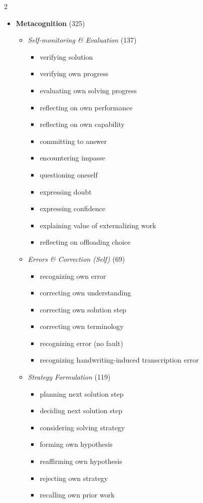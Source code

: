 \begin{multicols}{2}
\begin{itemize}[leftmargin=*, itemsep=2pt, topsep=0pt]
        \columnbreak
        \item \textbf{Metacognition} (325)
        \begin{itemize}[leftmargin=*, nosep]
            \item \textit{Self-monitoring \& Evaluation} (137)
            \begin{itemize}[leftmargin=*, nosep]
                \item verifying solution
                \item verifying own progress
                \item evaluating own solving progress
                \item reflecting on own performance
                \item reflecting on own capability
                \item committing to answer
                \item encountering impasse
                \item questioning oneself
                \item expressing doubt
                \item expressing confidence
                \item explaining value of externalizing work
                \item reflecting on offloading choice
            \end{itemize}
            \item \textit{Errors \& Correction (Self)} (69)
            \begin{itemize}[leftmargin=*, nosep]
                \item recognizing own error
                \item correcting own understanding
                \item correcting own solution step
                \item correcting own terminology
                \item recognizing error (no fault)
                \item recognizing handwriting-induced transcription error
            \end{itemize}
            \item \textit{Strategy Formulation} (119)
            \begin{itemize}[leftmargin=*, nosep]
                \item planning next solution step
                \item deciding next solution step
                \item considering solving strategy
                \item forming own hypothesis
                \item reaffirming own hypothesis
                \item rejecting own strategy
                \item recalling own prior work
            \end{itemize}
        \end{itemize}


\end{itemize}
\end{multicols}
